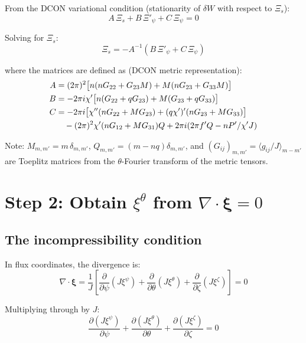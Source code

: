 \documentclass[12pt,a4paper]{article}
\newcommand{\bxi}{\boldsymbol{\xi}}
\begin{document}
From the DCON variational condition (stationarity of $\delta W$ with respect to $\Xi_s$):
\begin{equation}
    A\,\Xi_s + B\,\Xi'_\psi + C\,\Xi_\psi = 0
\end{equation}

Solving for $\Xi_s$:
\begin{equation}
    \boxed{\Xi_s = -A^{-1}\!\left(B\,\Xi'_\psi + C\,\Xi_\psi\right)}
    \label{eq:Xis}
\end{equation}

where the matrices are defined as (DCON metric representation):
\begin{align}
    A &= (2\pi)^2\bigl[n(nG_{22} + G_{23}M) + M(nG_{23}+G_{33}M)\bigr] \\
    B &= -2\pi i\chi'\bigl[n(G_{22}+qG_{23})+M(G_{23}+qG_{33})\bigr] \\
    C &= -2\pi i\bigl[\chi''(nG_{22}+MG_{23})+(q\chi')'(nG_{23}+MG_{33})\bigr] \notag\\
      &\quad -(2\pi)^2\chi'(nG_{12}+MG_{31})Q + 2\pi i(2\pi f'Q - nP'/\chi'J)
\end{align}

\noindent Note: $M_{m,m'} = m\,\delta_{m,m'}$, $Q_{m,m'} = (m-nq)\delta_{m,m'}$, 
and $(G_{ij})_{m,m'} = \langle g_{ij}/J\rangle_{m-m'}$ are Toeplitz matrices from the 
$\theta$-Fourier transform of the metric tensors.

\section{Step 2: Obtain $\xi^\theta$ from $\nabla\cdot\bxi = 0$}

\subsection{The incompressibility condition}

In flux coordinates, the divergence is:
\begin{equation}
    \nabla\cdot\bxi = \frac{1}{J}\left[
    \frac{\partial}{\partial\psi}(J\xi^\psi) 
    + \frac{\partial}{\partial\theta}(J\xi^\theta)
    + \frac{\partial}{\partial\zeta}(J\xi^\zeta)
    \right] = 0
\end{equation}

Multiplying through by $J$:
\begin{equation}
    \frac{\partial(J\xi^\psi)}{\partial\psi} 
    + \frac{\partial(J\xi^\theta)}{\partial\theta}
    + \frac{\partial(J\xi^\zeta)}{\partial\zeta} = 0
    \label{eq:divxi}
\end{equation}
\end{document}
